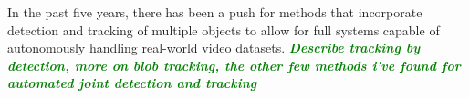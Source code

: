 \documentclass[smallcondensed, final]{svjour3}
\newcommand{\willie}[1]{\textcolor{green}{\textsf{\emph{\textbf{\textcolor{green}{#1}}}}}}
\begin{document}
In the past five years, there has been a push for methods that incorporate detection and tracking of multiple objects to allow for full systems capable of autonomously handling real-world video datasets.
\willie{Describe tracking by detection, more on blob tracking, the other few methods i've found for automated joint detection and tracking}








% 
\end{document}
